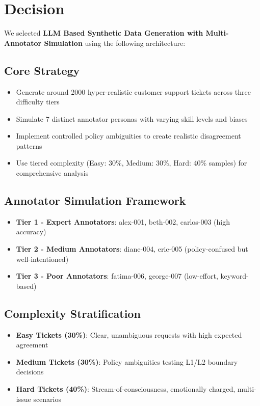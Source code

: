 \documentclass[11pt]{article}
\begin{document}
\section{Decision}

We selected \textbf{LLM Based Synthetic Data Generation with Multi-Annotator Simulation} using the following architecture:

\subsection{Core Strategy}
\begin{itemize}
\item Generate around 2000 hyper-realistic customer support tickets across three difficulty tiers
\item Simulate 7 distinct annotator personas with varying skill levels and biases
\item Implement controlled policy ambiguities to create realistic disagreement patterns
\item Use tiered complexity (Easy: 30\%, Medium: 30\%, Hard: 40\% samples) for comprehensive analysis
\end{itemize}

\subsection{Annotator Simulation Framework}
\begin{itemize}
\item \textbf{Tier 1 - Expert Annotators}: alex-001, beth-002, carlos-003 (high accuracy)
\item \textbf{Tier 2 - Medium Annotators}: diane-004, eric-005 (policy-confused but well-intentioned)  
\item \textbf{Tier 3 - Poor Annotators}: fatima-006, george-007 (low-effort, keyword-based)
\end{itemize}

\subsection{Complexity Stratification}
\begin{itemize}
\item \textbf{Easy Tickets (30\%)}: Clear, unambiguous requests with high expected agreement
\item \textbf{Medium Tickets (30\%)}: Policy ambiguities testing L1/L2 boundary decisions
\item \textbf{Hard Tickets (40\%)}: Stream-of-consciousness, emotionally charged, multi-issue scenarios
\end{itemize}
\end{document}
